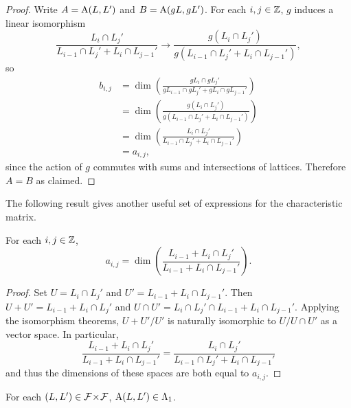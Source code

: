 \documentclass[a4paper, 11pt]{report}
\begin{document}
\begin{proof}
Write $A=\operatorname{A}(L,L')$ and $B=\operatorname{A}(gL,gL')$. For each $i,j\in\mathbb{Z}$, $g$ induces a linear isomorphism
\begin{equation*}
\frac{L_i\cap L_j'}{L_{i-1}\cap L_j' + L_i\cap L_{j-1}'} \to \frac{g(L_i\cap L_j')}{g(L_{i-1}\cap L_j' + L_i\cap L_{j-1}')},
\end{equation*}
so
\begin{align*}
b_{i,j}
&= \dim\left(\frac{gL_i\cap gL_j'}{gL_{i-1}\cap gL_j' + gL_i\cap gL_{j-1}'}\right)\\
&= \dim\left(\frac{g(L_i\cap L_j')}{g(L_{i-1}\cap L_j' + L_i\cap L_{j-1}')}\right)\\
&= \dim\left(\frac{L_i\cap L_j'}{L_{i-1}\cap L_j' + L_i\cap L_{j-1}'}\right)\\
&= a_{i,j},
\end{align*}
since the action of $g$ commutes with sums and intersections of lattices. Therefore $A=B$ as claimed.
\end{proof}

The following result gives another useful set of expressions for the characteristic matrix.
\begin{lemma}\label{lemma:characteristic-matrix-alternative}
For each $i,j\in\mathbb{Z}$,
\begin{equation*}
a_{i,j} = \dim\left(\frac{L_{i-1} + L_i\cap L_j'}{L_{i-1} + L_i\cap L_{j-1}'}\right).
\end{equation*}
\end{lemma}

\begin{proof}
Set $U=L_i\cap L_j'$ and $U'=L_{i-1}+L_i\cap L_{j-1}'$. Then $U+U'=L_{i-1}+L_i\cap L_j'$ and $U\cap U'= L_i\cap L_j'\cap L_{i-1} + L_i\cap L_{j-1}'$. Applying the isomorphism theorems, ${U+U'}/{U'}$ is naturally isomorphic to $U/{U\cap U'}$ as a vector space. In particular,
\begin{equation*}
\frac{L_{i-1}+L_i\cap L_j'}{L_{i-1} + L_i\cap L_{j-1}'} = \frac{L_i\cap L_j'}{L_{i-1}\cap L_j' + L_i\cap L_{j-1}'}
\end{equation*}
and thus the dimensions of these spaces are both equal to $a_{i,j}$.
\end{proof}

\begin{lemma}
For each $(L,L')\in{\mathcal{F}\!\times\!\mathcal{F}}$, $\operatorname{A}(L,L')\in\Lambda_1{}$.
\end{lemma}
\end{document}
